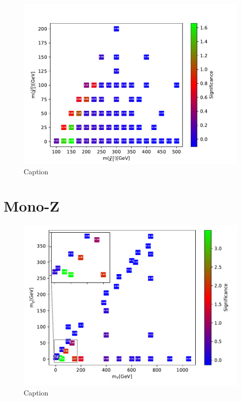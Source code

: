 \begin{figure}
    \centering
    \includegraphics[width = \textwidth]{Figures/Significances/significance_NN_WW_High_level.pdf}
    \caption{Caption}
    \label{fig:my_label}
\end{figure}























\section{Mono-Z}
\label{sec:resMono-Z}
\begin{figure}[H]
    \centering
    \includegraphics[width = \textwidth]{Figures/Significances/significanceCutandCount_monoZ_all.pdf}
    \caption{Caption}
    \label{fig:my_label}
\end{figure}



